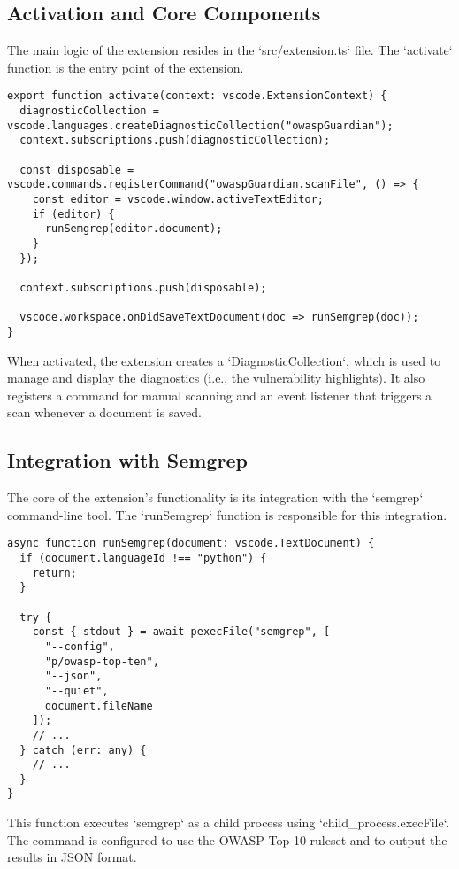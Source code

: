 \subsection{Activation and Core Components}

The main logic of the extension resides in the `src/extension.ts` file. The `activate` function is the entry point of the extension.

\begin{verbatim}
export function activate(context: vscode.ExtensionContext) {
  diagnosticCollection = vscode.languages.createDiagnosticCollection("owaspGuardian");
  context.subscriptions.push(diagnosticCollection);

  const disposable = vscode.commands.registerCommand("owaspGuardian.scanFile", () => {
    const editor = vscode.window.activeTextEditor;
    if (editor) {
      runSemgrep(editor.document);
    }
  });

  context.subscriptions.push(disposable);

  vscode.workspace.onDidSaveTextDocument(doc => runSemgrep(doc));
}
\end{verbatim}

When activated, the extension creates a `DiagnosticCollection`, which is used to manage and display the diagnostics (i.e., the vulnerability highlights). It also registers a command for manual scanning and an event listener that triggers a scan whenever a document is saved.

\subsection{Integration with Semgrep}

The core of the extension's functionality is its integration with the `semgrep` command-line tool. The `runSemgrep` function is responsible for this integration.

\begin{verbatim}
async function runSemgrep(document: vscode.TextDocument) {
  if (document.languageId !== "python") {
    return;
  }

  try {
    const { stdout } = await pexecFile("semgrep", [
      "--config",
      "p/owasp-top-ten",
      "--json",
      "--quiet",
      document.fileName
    ]);
    // ...
  } catch (err: any) {
    // ...
  }
}
\end{verbatim}

This function executes `semgrep` as a child process using `child\_process.execFile`. The command is configured to use the OWASP Top 10 ruleset and to output the results in JSON format.

